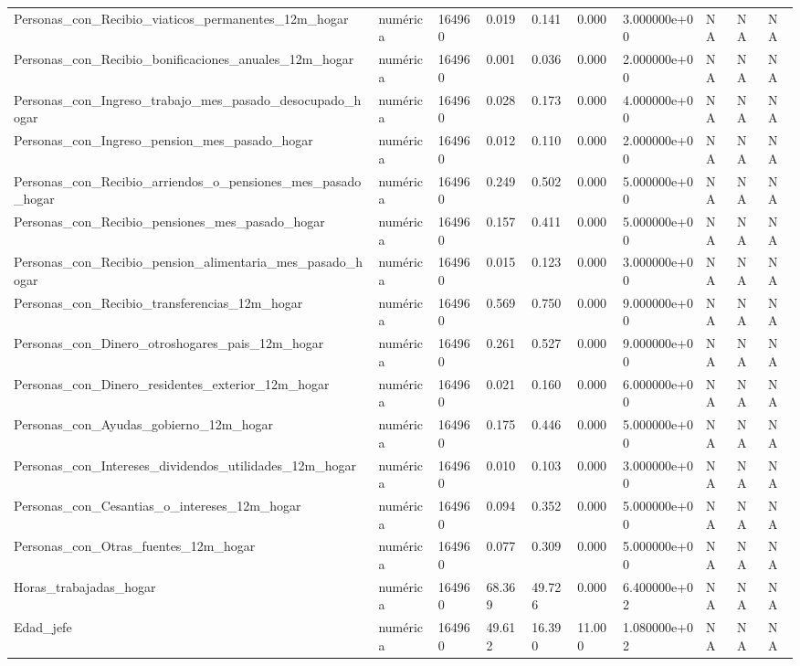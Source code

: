 \begin{longtable}[t]{llllllllll}
Personas\_con\_Recibio\_viaticos\_permanentes\_12m\_hogar & numérica & 164960 & 0.019 & 0.141 & 0.000 & 3.000000e+00 & NA & NA & NA\\
Personas\_con\_Recibio\_bonificaciones\_anuales\_12m\_hogar & numérica & 164960 & 0.001 & 0.036 & 0.000 & 2.000000e+00 & NA & NA & NA\\
Personas\_con\_Ingreso\_trabajo\_mes\_pasado\_desocupado\_hogar & numérica & 164960 & 0.028 & 0.173 & 0.000 & 4.000000e+00 & NA & NA & NA\\
Personas\_con\_Ingreso\_pension\_mes\_pasado\_hogar & numérica & 164960 & 0.012 & 0.110 & 0.000 & 2.000000e+00 & NA & NA & NA\\
Personas\_con\_Recibio\_arriendos\_o\_pensiones\_mes\_pasado\_hogar & numérica & 164960 & 0.249 & 0.502 & 0.000 & 5.000000e+00 & NA & NA & NA\\
Personas\_con\_Recibio\_pensiones\_mes\_pasado\_hogar & numérica & 164960 & 0.157 & 0.411 & 0.000 & 5.000000e+00 & NA & NA & NA\\
Personas\_con\_Recibio\_pension\_alimentaria\_mes\_pasado\_hogar & numérica & 164960 & 0.015 & 0.123 & 0.000 & 3.000000e+00 & NA & NA & NA\\
Personas\_con\_Recibio\_transferencias\_12m\_hogar & numérica & 164960 & 0.569 & 0.750 & 0.000 & 9.000000e+00 & NA & NA & NA\\
Personas\_con\_Dinero\_otroshogares\_pais\_12m\_hogar & numérica & 164960 & 0.261 & 0.527 & 0.000 & 9.000000e+00 & NA & NA & NA\\
Personas\_con\_Dinero\_residentes\_exterior\_12m\_hogar & numérica & 164960 & 0.021 & 0.160 & 0.000 & 6.000000e+00 & NA & NA & NA\\
Personas\_con\_Ayudas\_gobierno\_12m\_hogar & numérica & 164960 & 0.175 & 0.446 & 0.000 & 5.000000e+00 & NA & NA & NA\\
Personas\_con\_Intereses\_dividendos\_utilidades\_12m\_hogar & numérica & 164960 & 0.010 & 0.103 & 0.000 & 3.000000e+00 & NA & NA & NA\\
Personas\_con\_Cesantias\_o\_intereses\_12m\_hogar & numérica & 164960 & 0.094 & 0.352 & 0.000 & 5.000000e+00 & NA & NA & NA\\
Personas\_con\_Otras\_fuentes\_12m\_hogar & numérica & 164960 & 0.077 & 0.309 & 0.000 & 5.000000e+00 & NA & NA & NA\\
Horas\_trabajadas\_hogar & numérica & 164960 & 68.369 & 49.726 & 0.000 & 6.400000e+02 & NA & NA & NA\\
Edad\_jefe & numérica & 164960 & 49.612 & 16.390 & 11.000 & 1.080000e+02 & NA & NA & NA\\

\end{longtable}
